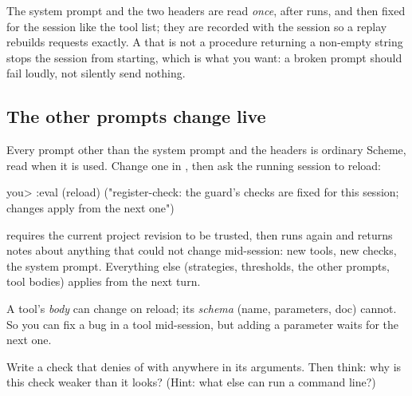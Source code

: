 \begin{careful}
The system prompt and the two headers are read \emph{once}, after
 runs, and then fixed for the session like the tool list;
they are recorded with the session so a replay rebuilds requests exactly.
A  that is not a procedure returning a non-empty string
stops the session from starting, which is what you want: a broken prompt
should fail loudly, not silently send nothing.
\end{careful}

\subsection{The other prompts change live}

Every prompt other than the system prompt and the headers is ordinary
Scheme, read when it is used. Change one in , then ask the
running session to reload:

\begin{txt}
you> :eval (reload)
("register-check: the guard's checks are fixed for this session; changes apply from the next one")
\end{txt}

 requires the current project revision to be trusted, then runs  again and returns notes about anything
that could not change mid-session: new tools, new checks, the system
prompt. Everything else (strategies, thresholds, the other prompts, tool
bodies) applies from the next turn.

\begin{tip}
A tool's \emph{body} can change on reload; its \emph{schema} (name,
parameters, doc) cannot. So you can fix a bug in a tool mid-session, but
adding a parameter waits for the next one.
\end{tip}

\begin{puzzle}
Write a check  that denies  of
 with  anywhere in its arguments. Then think: why is
this check weaker than it looks? (Hint: what else can run a command
line?)
\end{puzzle}
